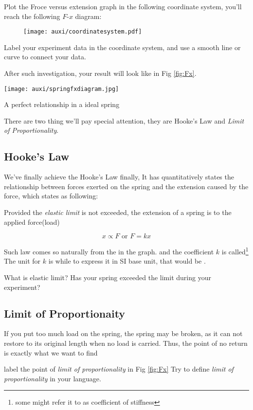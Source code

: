 \documentclass[a4paper]{tufte-handout}
\newenvironment{TaskBox} %
{\begin{tcolorbox}[breakable,colback=b1!30,colframe=b1,title=Task]} {\end{tcolorbox}}
\newenvironment{SummBox}
{\begin{tcolorbox}[breakable,colback=r1!30,colframe=r1,title=Summary]} {\end{tcolorbox}}
\begin{document}
Plot the Froce versus extension graph in the following coordinate system, you'll reach the following $F$-$x$ diagram:
\begin{figure}
\centering
\texttt{[image: auxi/coordinatesystem.pdf]}
\end{figure}

\begin{TaskBox}
Label your experiment data in the coordinate system, and use a smooth line or curve to connect your data.  
\end{TaskBox}

After such investigation, your result will look like in Fig \ref{fig:Fx}.
\begin{marginfigure}
\texttt{[image: auxi/springfxdiagram.jpg]}
\caption{A perfect relationship in a ideal spring}
\label{fig:Fx}
\end{marginfigure}

There are two thing we'll pay special attention, they are Hooke's Law and \emph{Limit of Proportionality}.

\subsection{Hooke's Law}
We've finally achieve the Hooke's Law finally, It has quantitatively states the relationship between forces exerted on the spring and the extension caused by the force, which states as following:
\begin{SummBox}
Provided the \emph{elastic limit} is not exceeded, the extension of a spring is \uline{\hspace{2in}} to the applied force(load)

\[
x\propto F \text{ or } F=kx
\]
\end{SummBox}
Such law comes so naturally from the \uline{\hspace{1.5 in}}
in the graph. and the coefficient $k$ is called\footnote{some might refer it to as coefficient of stiffness}  \uline{\hspace{1.5 in}}
The unit for $k$ is \uline{\hspace{1.3in}} while to express it in SI base unit, that would be \uline{\hspace{1.3in}}.


\begin{TaskBox}
What is elastic limit?
\tcblower
Has your spring exceeded the limit during your experiment?
\end{TaskBox}

\subsection{Limit of Proportionaity}
If you put too much load on the spring, the spring may be broken, as it can not restore to its original length when no load is carried. Thus, the point of no return is exactly what we want to find
\begin{TaskBox}
label the point of \emph{limit of proportionality} in Fig \ref{fig:Fx}
\tcblower
Try to define \emph{limit of proportionality} in your language.
\vspace{2in}
\end{TaskBox}
\end{document}
